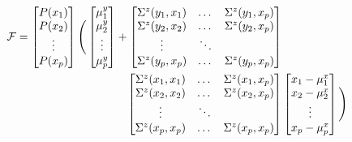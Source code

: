 \begin{equation}
	\begin{split}
		\mathcal F=\begin{bmatrix}
			P(x_1) \\
			P(x_2) \\
			\vdots \\
			P(x_p) \\
		\end{bmatrix}\Bigg(
		\begin{bmatrix}
			\mu_1^y \\
			\mu_2^y \\
			\vdots \\
			\mu_p^y
		\end{bmatrix} + 
		\begin{bmatrix}
			\Sigma^z(y_1,x_1) & \dots & \Sigma^z(y_1,x_p) \\
			\Sigma^z(y_2,x_2) & \dots & \Sigma^z(y_2,x_p)\\
			\vdots & \ddots & \\
			\Sigma^z(y_p,x_p) & \dots & \Sigma^z(y_p,x_p)\\
		\end{bmatrix} & \\
		\begin{bmatrix}
			\Sigma^z(x_1,x_1) & \dots & \Sigma^z(x_1,x_p) \\
			\Sigma^z(x_2,x_2) & \dots & \Sigma^z(x_2,x_p)\\
			\vdots & \ddots & \\
			\Sigma^z(x_p,x_p) & \dots & \Sigma^z(x_p,x_p)\\
		\end{bmatrix} &
		\begin{bmatrix}
			x_1 - \mu_1^x \\
			x_2 - \mu_2^x \\
			\vdots \\
			x_p - \mu_p^x \\
		\end{bmatrix}\Bigg)
	\end{split}
\end{equation}

